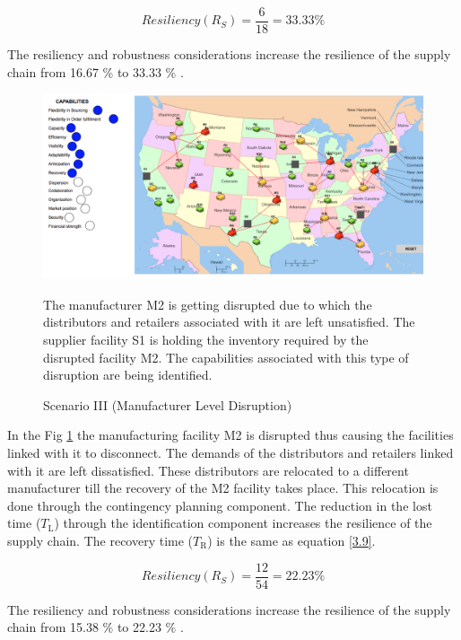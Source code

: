 \begin{equation}
    Resiliency(R_S) = \frac{6}{18} = 33.33 \% \label{3.23}
\end{equation}

The resiliency and robustness considerations increase the resilience of the supply chain from 16.67 \% to 33.33 \% .

\begin{figure}[H]
  \centering
  \includegraphics[width=6.5in]{figures/pdf/S3MLD.png}\\
  \caption{Scenario III (Manufacturer Level Disruption)}
  {The manufacturer M2 is getting disrupted due to which the  distributors and retailers associated with it are left unsatisfied. The supplier facility S1 is holding the inventory required by the disrupted facility M2. The capabilities associated with this type of disruption are being identified.}
  \label{S3ML}
\end{figure}   

In the Fig \ref{S3ML} the manufacturing facility M2 is disrupted thus causing the facilities linked with it to disconnect. The demands of the distributors and retailers linked with it are left dissatisfied. These distributors are relocated to a different manufacturer till the recovery of the M2 facility takes place. This relocation is done through the contingency planning component. The reduction in the lost time ($T_{\text{L}}$) through the identification component increases the resilience of the supply chain. The recovery time ($T_{\text{R}}$) is the same as equation \ref{3.9}. 

\begin{equation}
    Resiliency(R_S) = \frac{12}{54} = 22.23 \% \label{3.24}
\end{equation}

The resiliency and robustness considerations increase the resilience of the supply chain from 15.38 \% to 22.23 \% .


